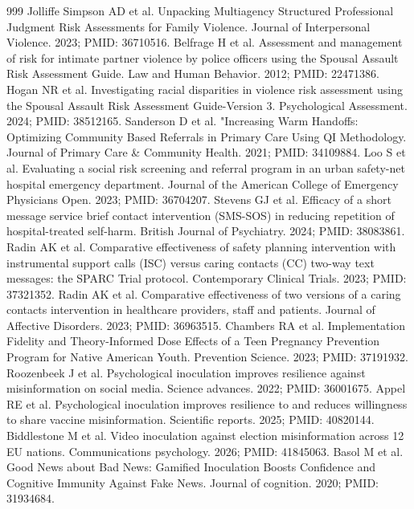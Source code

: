 \documentclass[11pt]{article}
\begin{document}
\begin{thebibliography}{999}
 Jolliffe Simpson AD et al. Unpacking Multiagency Structured Professional Judgment Risk Assessments for Family Violence. Journal of Interpersonal Violence. 2023; PMID: 36710516.
 Belfrage H et al. Assessment and management of risk for intimate partner violence by police officers using the Spousal Assault Risk Assessment Guide. Law and Human Behavior. 2012; PMID: 22471386.
 Hogan NR et al. Investigating racial disparities in violence risk assessment using the Spousal Assault Risk Assessment Guide-Version 3. Psychological Assessment. 2024; PMID: 38512165.
 Sanderson D et al. "Increasing Warm Handoffs: Optimizing Community Based Referrals in Primary Care Using QI Methodology. Journal of Primary Care \& Community Health. 2021; PMID: 34109884.
 Loo S et al. Evaluating a social risk screening and referral program in an urban safety-net hospital emergency department. Journal of the American College of Emergency Physicians Open. 2023; PMID: 36704207.
 Stevens GJ et al. Efficacy of a short message service brief contact intervention (SMS-SOS) in reducing repetition of hospital-treated self-harm. British Journal of Psychiatry. 2024; PMID: 38083861.
 Radin AK et al. Comparative effectiveness of safety planning intervention with instrumental support calls (ISC) versus caring contacts (CC) two-way text messages: the SPARC Trial protocol. Contemporary Clinical Trials. 2023; PMID: 37321352.
 Radin AK et al. Comparative effectiveness of two versions of a caring contacts intervention in healthcare providers, staff and patients. Journal of Affective Disorders. 2023; PMID: 36963515.
 Chambers RA et al. Implementation Fidelity and Theory-Informed Dose Effects of a Teen Pregnancy Prevention Program for Native American Youth. Prevention Science. 2023; PMID: 37191932.
 Roozenbeek J et al. Psychological inoculation improves resilience against misinformation on social media. Science advances. 2022; PMID: 36001675.
 Appel RE et al. Psychological inoculation improves resilience to and reduces willingness to share vaccine misinformation. Scientific reports. 2025; PMID: 40820144.
 Biddlestone M et al. Video inoculation against election misinformation across 12 EU nations. Communications psychology. 2026; PMID: 41845063.
 Basol M et al. Good News about Bad News: Gamified Inoculation Boosts Confidence and Cognitive Immunity Against Fake News. Journal of cognition. 2020; PMID: 31934684.

\end{thebibliography}
\end{document}
